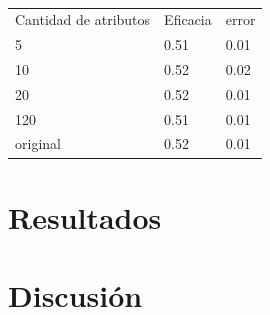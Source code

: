 \documentclass[a4paper,10pt]{article}
\begin{document}
\begin{table}
\centering
\caption{}
\label{table:NB}
\begin{tabular}{lll}
Cantidad de atributos & Eficacia & error \\
5 & 0.51 & 0.01 \\
10 & 0.52 & 0.02 \\
20 & 0.52 & 0.01 \\
120 & 0.51 & 0.01 \\
original & 0.52 & 0.01 \\
\end{tabular}
\end{table}

\section{Resultados}

\section{Discusi\'on}


\scriptsize


\end{document}

